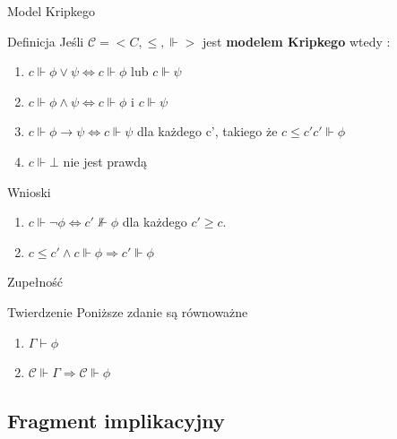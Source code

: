 \documentclass{beamer}
\begin{document}
\begin{frame}{Model Kripkego}
 \begin{block}{Definicja}
Jeśli \( \mathcal{C} = < C, \leq, \Vdash> \) jest \textbf{modelem Kripkego} wtedy : 
\begin{enumerate}
	\item \(c \Vdash \phi \vee \psi \Leftrightarrow c \Vdash  \phi \) lub \( c \Vdash \psi \) 
 \item \(c \Vdash \phi \wedge \psi \Leftrightarrow c \Vdash  \phi \) i \( c \Vdash \psi \) 
 \item \(c \Vdash \phi \rightarrow \psi \Leftrightarrow c \Vdash  \psi \) dla każdego c', takiego że \( c \leq c'  c' \Vdash \phi \) 
 \item \( c \Vdash \bot \) nie jest prawdą
 
\end{enumerate}
 \end{block}
 
  \begin{block}{Wnioski}

\begin{enumerate}

 \item \(c \Vdash \neg \phi \Leftrightarrow  c'\nVdash \phi\) dla każdego \( c' \geq c\).

 \item \(c \leq c' \wedge  c \Vdash \phi \Rightarrow c' \Vdash \phi \)
\end{enumerate}
 \end{block}
\end{frame}


\begin{frame}{Zupełność}
 \begin{block}{Twierdzenie}
Poniższe zdanie są równoważne
\begin{enumerate}
\item \( \Gamma \vdash \phi \)
\item \( \mathcal{C} \Vdash \Gamma \Rightarrow \mathcal{C} \Vdash \phi \)
\end{enumerate}
 \end{block}
 
\end{frame}

\subsection{Fragment implikacyjny}
\end{document}
